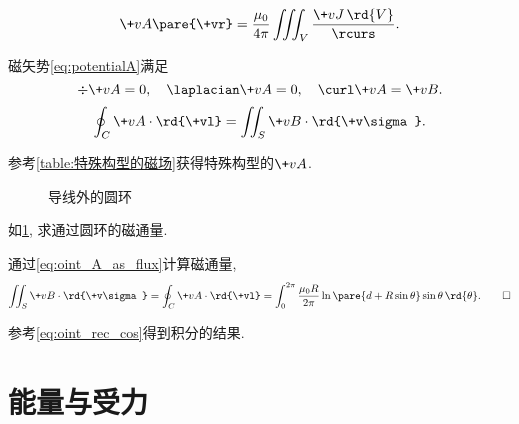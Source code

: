 \documentclass[hidelinks]{ctexart}
\begin{document}
\begin{finale}
    \begin{definition}
        [磁矢势]
        \begin{equation}
        \label{eq:potentialA}
            \+vA\pare{\+vr} = \frac{\mu_0}{4\pi}\iiint_V \frac{\+vJ\,\rd{V}}{\rcurs}.
        \end{equation}
    \end{definition}
    \begin{theorem}
        磁矢势\eqref{eq:potentialA}满足
        \[ \div \+vA = 0,\quad \laplacian \+vA = 0,\quad \curl \+vA = \+vB. \]
        \begin{equation}
        \label{eq:oint_A_as_flux}
            \oint_C \+vA \cdot\rd{\+vl} = \iint_S \+vB\cdot\rd{\+v\sigma}.
        \end{equation}
    \end{theorem}
\end{finale}
\begin{hardlink}
    参考\cref{table:特殊构型的磁场}获得特殊构型的$\+vA$.
\end{hardlink}
\begin{figure}[ht]
    \centering
    \caption{导线外的圆环}
    \label{fig:导线外的圆环}
\end{figure}
\begin{sample}
    \begin{ex}[习题8.3]
        如\cref{fig:导线外的圆环}, 求通过圆环的磁通量.
    \end{ex}
    \begin{solution}
        通过\eqref{eq:oint_A_as_flux}计算磁通量,
        \[ \iint_S \+vB\cdot\rd{\+v\sigma} = \oint_C \+vA\cdot\rd{\+vl} = \int_0^{2\pi}\frac{\mu_0R}{2\pi}\ln\pare{d+R\sin\theta}\sin\theta\,\rd{\theta}. \qedhere \]
    \end{solution}
    \begin{hardlink}
        参考\eqref{eq:oint_rec_cos}得到积分的结果.
    \end{hardlink}
\end{sample}




\section{能量与受力} %
\label{sec:能量与受力}
\end{document}
